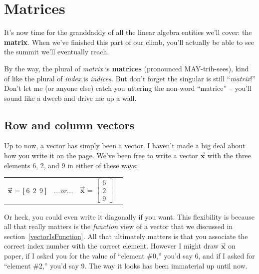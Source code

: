 

\chapter{Matrices}
\label{ch:matrices}

It's now time for the granddaddy of all the linear algebra entities we'll
cover: the \textbf{matrix}. When we've finished this part of our climb, you'll
actually be able to see the summit we'll eventually reach.

By the way, the plural of \textit{matrix} is \textbf{matrices} (pronounced
MAY-trih-sees), kind of like the plural of \textit{index} is \textit{indices.}
But don't forget the singular is still ``\textit{matrix}!'' Don't let me (or
anyone else) catch you uttering the non-word ``matrice'' -- you'll sound like a
dweeb and drive me up a wall.

\section{Row and column vectors}

Up to now, a vector has simply been a vector. I haven't made a big deal about
how you write it on the page. We've been free to write a vector
$\overrightarrow{\textbf{x}}$ with the three elements 6, 2, and 9 in either of
these ways:

\vspace{-.15in}
\begin{center}
\begin{tabular}{ccc}
$\overrightarrow{\textbf{x}}$ = \textbf{[}$\ 6\ \ 2\ \ 9\ $\textbf{]} &
\quad\quad \textit{...or...} \quad\quad &
$\overrightarrow{\textbf{x}}$ = $\begin{bmatrix} 6 \\ 2 \\ 9 \end{bmatrix}$ \ 
\end{tabular}
\end{center}
\vspace{-.15in}


Or heck, you could even write it diagonally if you want. This flexibility is
because all that really matters is the \textit{function} view of a vector that
we discussed in section~\ref{vectorIsFunction}. All that ultimately matters is
that you associate the correct index number with the correct element. However I
might draw $\overrightarrow{\textbf{x}}$ on paper, if I asked you for the value
of ``element \#0,'' you'd say 6, and if I asked for ``element \#2,'' you'd say
9. The way it looks has been immaterial up until now.

